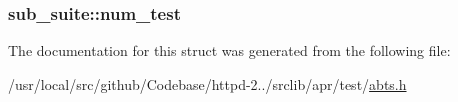 \subsubsection[{\texorpdfstring{num\+\_\+test}{num_test}}]{ sub\+\_\+suite\+::num\+\_\+test}\hypertarget{structsub__suite_a6093827736a60fc08bf3bfcf9e3da403}{}\label{structsub__suite_a6093827736a60fc08bf3bfcf9e3da403}


The documentation for this struct was generated from the following file\+:\begin{DoxyCompactItemize}
\item 
/usr/local/src/github/\+Codebase/httpd-\/2../srclib/apr/test/\hyperlink{test_2abts_8h}{abts.\+h}\end{DoxyCompactItemize}

